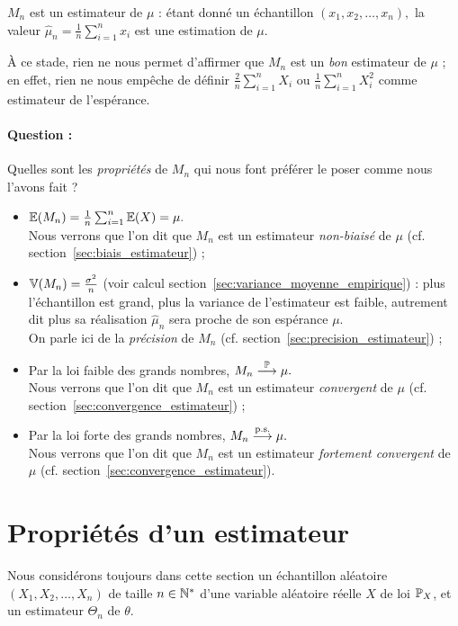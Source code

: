 $M_n$ est un estimateur de $\mu$ : étant donné un échantillon
$(x_1, x_2, \dots, x_n),$ la valeur $\hat{\mu}_n = \frac1n \sum_{i=1}^n x_i$ est
une estimation de $\mu$.

À ce stade, rien ne nous permet d'affirmer que $M_n$ est un \textit{bon}
estimateur de $\mu$ ; en effet, rien ne nous empêche de définir
$\frac2n \sum_{i=1}^n X_i$ ou $\frac1n \sum_{i=1}^n X_i^2$ comme estimateur de l'espérance.


\paragraph{Question :} Quelles sont les \textit{propriétés} de $M_n$
qui nous font préférer le poser comme nous l'avons fait ?

\begin{answer}
  \begin{itemize}
  \item $\mathbb{E}(M_n) = \frac1n \sum_{i=1}^n \mathbb{E}(X) = \mu.$ \\Nous verrons que l'on dit que $M_n$ est un estimateur
    \textit{non-biaisé} de $\mu$ (cf. section~\ref{sec:biais_estimateur}) ;
  \item $\mathbb{V}(M_n) = \frac{\sigma^2}{n}$ (voir calcul
    section~\ref{sec:variance_moyenne_empirique}) : plus l'échantillon est
    grand, plus la variance de l'estimateur est faible, autrement dit plus sa
    réalisation $\hat{\mu}_n$ sera proche de son espérance $\mu$. \\On parle ici de
    la \textit{précision} de $M_n$ (cf. section~\ref{sec:precision_estimateur})
    ;
  \item Par la loi faible des grands nombres, $M_n \stackrel{\mathbb{P}}{\longrightarrow} \mu.$ \\Nous verrons
    que l'on dit que $M_n$ est un estimateur \textit{convergent} de $\mu$
    (cf. section~\ref{sec:convergence_estimateur}) ;
  \item Par la loi forte des grands nombres, $M_n \stackrel{\text{p.s.}}{\longrightarrow} \mu.$ \\Nous verrons que
    l'on dit que $M_n$ est un estimateur \textit{fortement convergent} de $\mu$
    (cf. section~\ref{sec:convergence_estimateur}).
  \end{itemize}
\end{answer}


\section{Propriétés d'un estimateur}
Nous considérons toujours dans cette section un échantillon aléatoire
$(X_1, X_2, \dots, X_n)$ de taille $n \in \mathbb{N}^*$ d'une variable aléatoire
réelle $X$ de loi $\mathbb{P}_X$, et un estimateur $\Theta_n$ de $\theta$.

